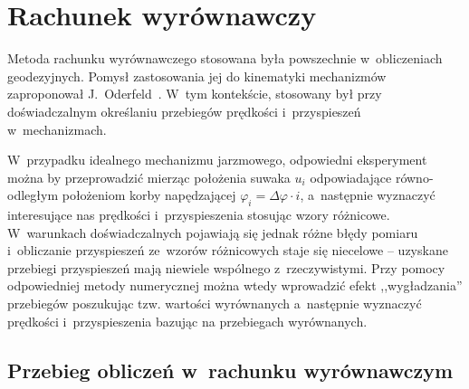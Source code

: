 \documentclass[paper=a4,DIV=12]{tmmlab}
\newcommand{\degree}{^{\circ}}
\begin{document}
\section{Rachunek wyrównawczy}
\label{sec:SZZY1}

Metoda rachunku wyrównawczego stosowana była powszechnie w~obliczeniach
geodezyjnych. Pomysł zastosowania jej do kinematyki mechanizmów zaproponował
J.~Oderfeld~\cite{oderfeld:1962:wstep}. W~tym kontekście, stosowany był przy
doświadczalnym określaniu przebiegów prędkości i~przyspieszeń w~mechanizmach.

W~przypadku idealnego mechanizmu jarzmowego, odpowiedni eksperyment można by
przeprowadzić mierząc położenia suwaka $u_i$ odpowiadające równo-odległym
położeniom korby napędzającej $\varphi_i = \Delta\varphi \cdot i$, a~następnie
wyznaczyć interesujące nas prędkości i~przyspieszenia stosując wzory różnicowe.
W~warunkach doświadczalnych pojawiają się jednak różne błędy pomiaru
i~obliczanie przyspieszeń ze~wzorów różnicowych staje się niecelowe -- uzyskane
przebiegi przyspieszeń mają niewiele wspólnego z~rzeczywistymi. Przy pomocy
odpowiedniej metody numerycznej można wtedy wprowadzić efekt ,,wygładzania''
przebiegów poszukując tzw. wartości wyrównanych a~następnie wyznaczyć prędkości
i~przyspieszenia bazując na przebiegach wyrównanych.


\subsection{Przebieg obliczeń w~rachunku wyrównawczym}
\label{eq:R48E7}
\end{document}
